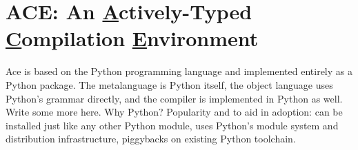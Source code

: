 \documentclass[10pt, conference, compsocconf]{IEEEtran}
\begin{document}

%
%
%

\section{ACE: An \underline{A}ctively-Typed \underline{C}ompilation \underline{E}nvironment}
Ace is based on the Python programming language and implemented entirely as a Python package. The metalanguage is Python itself, the object language uses Python's grammar directly, and the compiler is implemented in Python as well. Write some more here. Why Python? Popularity and to aid in adoption: can be installed just like any other Python module, uses Python's module system and distribution infrastructure, piggybacks on existing Python toolchain. 
\end{document}
